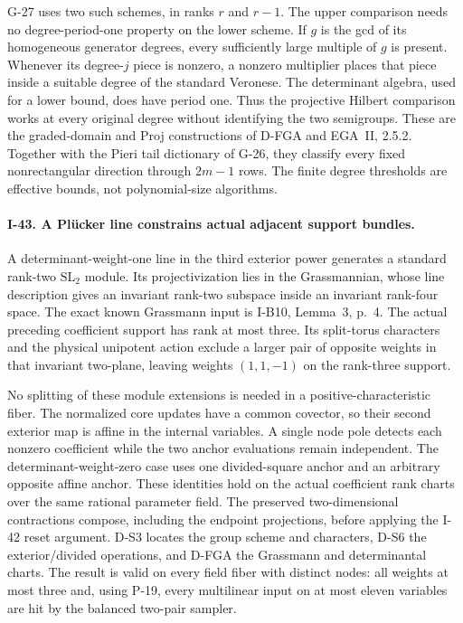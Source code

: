 G-27 uses two such schemes, in ranks $r$ and $r-1$. The upper
comparison needs no degree-period-one property on the lower
scheme. If $g$ is the gcd of its homogeneous generator
degrees, every sufficiently large multiple of $g$ is present.
Whenever its degree-$j$ piece is nonzero, a nonzero multiplier
places that piece inside a suitable degree of the standard
Veronese. The determinant algebra, used for a lower bound,
does have period one. Thus the projective Hilbert comparison
works at every original degree without identifying the two
semigroups. These are the graded-domain and Proj constructions
of D-FGA and EGA~II, 2.5.2. Together with the Pieri tail
dictionary of G-26, they classify every fixed nonrectangular
direction through $2m-1$ rows. The finite degree thresholds
are effective bounds, not polynomial-size algorithms.

\paragraph{I-43. A Pl\"ucker line constrains actual adjacent support bundles.}
A determinant-weight-one line in the third exterior power
generates a standard rank-two $\mathrm{SL}_2$ module. Its
projectivization lies in the Grassmannian, whose line
description gives an invariant rank-two subspace inside an
invariant rank-four space. The exact known Grassmann input
is I-B10, Lemma~3, p.~4. The actual preceding coefficient
support has rank at most three. Its split-torus characters
and the physical unipotent action exclude a larger pair
of opposite weights in that invariant two-plane, leaving
weights $(1,1,-1)$ on the rank-three support.

No splitting of these module extensions is needed in a
positive-characteristic fiber. The normalized core updates
have a common covector, so their second exterior map is
affine in the internal variables. A single node pole detects
each nonzero coefficient while the two anchor evaluations
remain independent. The determinant-weight-zero case uses
one divided-square anchor and an arbitrary opposite affine
anchor. These identities hold on the actual coefficient
rank charts over the same rational parameter field. The
preserved two-dimensional contractions compose, including
the endpoint projections, before applying the I-42 reset
argument. D-S3 locates the group scheme and characters,
D-S6 the exterior/divided operations, and D-FGA the
Grassmann and determinantal charts. The result is valid on
every field fiber with distinct nodes: all weights at most
three and, using P-19, every multilinear input on at most
eleven variables are hit by the balanced two-pair sampler.


